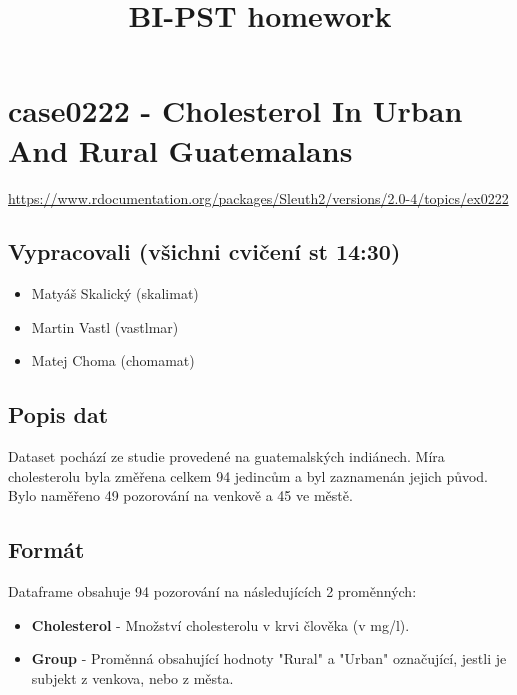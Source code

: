 \documentclass[11pt]{article}
\title{BI-PST homework}
\providecommand{\tightlist}{%
      \setlength{\itemsep}{0pt}\setlength{\parskip}{0pt}}
\begin{document}
    
    
    \maketitle
    
    

    
    \section{case0222 - Cholesterol In Urban And Rural
Guatemalans}\label{case0222---cholesterol-in-urban-and-rural-guatemalans}

\url{https://www.rdocumentation.org/packages/Sleuth2/versions/2.0-4/topics/ex0222}

\subsection{Vypracovali (všichni cvičení st
14:30)}\label{vypracovali-vux161ichni-cviux10denuxed-st-1430}

\begin{itemize}
\tightlist
\item
  Matyáš Skalický (skalimat)
\item
  Martin Vastl (vastlmar)
\item
  Matej Choma (chomamat)
\end{itemize}

\subsection{Popis dat}\label{popis-dat}

Dataset pochází ze studie provedené na guatemalských indiánech. Míra
cholesterolu byla změřena celkem 94 jedincům a byl zaznamenán jejich
původ. Bylo naměřeno 49 pozorování na venkově a 45 ve městě.

\subsection{Formát}\label{formuxe1t}

Dataframe obsahuje 94 pozorování na následujících 2 proměnných:

\begin{itemize}
\tightlist
\item
  \textbf{Cholesterol} - Množství cholesterolu v krvi člověka (v mg/l).
\item
  \textbf{Group} - Proměnná obsahující hodnoty "Rural" a "Urban"
  označující, jestli je subjekt z venkova, nebo z města.
\end{itemize}
\end{document}
